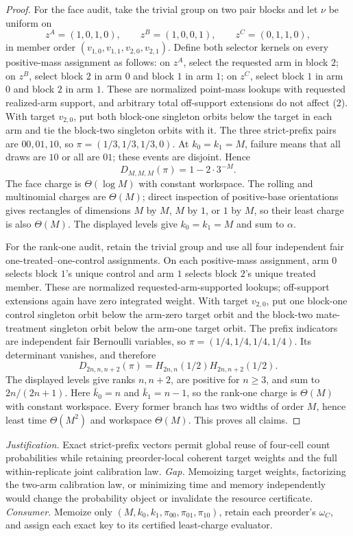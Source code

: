 \documentclass{article}
\begin{document}
\begin{proof}
For the face audit, take the trivial group on two pair blocks and let \(\nu\) be uniform on
\[
z^A=(1,0,1,0),\qquad z^B=(1,0,0,1),\qquad z^C=(0,1,1,0),
\tag{10}
\]
in member order \((v_{1,0},v_{1,1},v_{2,0},v_{2,1})\). Define both selector kernels on every positive-mass assignment as follows: on \(z^A\), select the requested arm in block \(2\); on \(z^B\), select block \(2\) in arm \(0\) and block \(1\) in arm \(1\); on \(z^C\), select block \(1\) in arm \(0\) and block \(2\) in arm \(1\). These are normalized point-mass lookups with requested realized-arm support, and arbitrary total off-support extensions do not affect (2). With target \(v_{2,0}\), put both block-one singleton orbits below the target in each arm and tie the block-two singleton orbits with it. The three strict-prefix pairs are \(00,01,10\), so \(\pi=(1/3,1/3,1/3,0)\). At \(k_0=k_1=M\), failure means that all draws are \(10\) or all are \(01\); these events are disjoint. Hence
\[
D_{M,M,M}(\pi)=1-2\cdot3^{-M}.
\tag{11}
\]
The face charge is \(\Theta(\log M)\) with constant workspace. The rolling and multinomial charges are \(\Theta(M)\); direct inspection of positive-base orientations gives rectangles of dimensions \(M\) by \(M\), \(M\) by \(1\), or \(1\) by \(M\), so their least charge is also \(\Theta(M)\). The displayed levels give \(k_0=k_1=M\) and sum to \(\alpha\).

For the rank-one audit, retain the trivial group and use all four independent fair one-treated--one-control assignments. On each positive-mass assignment, arm \(0\) selects block \(1\)'s unique control and arm \(1\) selects block \(2\)'s unique treated member. These are normalized requested-arm-supported lookups; off-support extensions again have zero integrated weight. With target \(v_{2,0}\), put one block-one control singleton orbit below the arm-zero target orbit and the block-two mate-treatment singleton orbit below the arm-one target orbit. The prefix indicators are independent fair Bernoulli variables, so \(\pi=(1/4,1/4,1/4,1/4)\). Its determinant vanishes, and therefore
\[
D_{2n,n,n+2}(\pi)=H_{2n,n}(1/2)H_{2n,n+2}(1/2).
\tag{12}
\]
The displayed levels give ranks \(n,n+2\), are positive for \(n\ge3\), and sum to \(2n/(2n+1)\). Here \(\bar k_0=n\) and \(\bar k_1=n-1\), so the rank-one charge is \(\Theta(M)\) with constant workspace. Every former branch has two widths of order \(M\), hence least time \(\Theta(M^2)\) and workspace \(\Theta(M)\). This proves all claims.
\end{proof}
\par\smallskip\noindent \textit{Justification.} Exact strict-prefix vectors permit global reuse of four-cell count probabilities while retaining preorder-local coherent target weights and the full within-replicate joint calibration law. \textit{Gap.} Memoizing target weights, factorizing the two-arm calibration law, or minimizing time and memory independently would change the probability object or invalidate the resource certificate. \textit{Consumer.} Memoize only \((M,k_0,k_1,\pi_{00},\pi_{01},\pi_{10})\), retain each preorder's \(\omega_C\), and assign each exact key to its certified least-charge evaluator.
\end{document}
